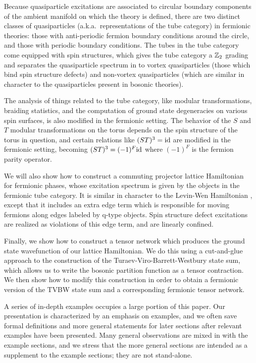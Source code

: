 Because quasiparticle excitations are associated to circular boundary components of the ambient 
manifold on which the theory is defined, there are two distinct classes of quasiparticles (a.k.a.\ representations of the tube category) in 
fermionic theories: those with anti-periodic fermion boundary conditions around the circle, and 
those with periodic boundary conditions. 
The tubes in the tube category come equipped with spin structures, which gives the tube category a $\mathbb{Z}_2$ grading
and separates the quasiparticle spectrum in to vortex quasiparticles (those which bind spin structure defects) 
and non-vortex quasiparticles (which are similar in character to the quasiparticles present in bosonic theories). 

The analysis of things related to the tube category, 
like modular transformations, braiding statistics, and the computation of ground state degeneracies on various spin surfaces,
is also modified in the fermionic setting.  
The behavior of the $S$ and $T$ modular transformations on the torus depends on the spin structure of the torus in question, and 
certain relations like $(ST)^3 = \text{id}$ are modified in the fermionic setting, becoming 
$(ST)^3=(-1)^F\text{id}$ where $(-1)^F$ is the fermion parity operator.

We will also show how to construct a commuting projector lattice Hamiltonian 
for fermionic phases, whose excitation spectrum is given by the objects in the fermionic tube category.  
It is similar in character to the Levin-Wen Hamiltonian \cite{levin2005}, 
except that it includes an extra edge term which is responsible for moving fermions along
edges labeled by q-type objects. 
Spin structure defect excitations 
are realized as violations of this edge term, and are linearly confined. 

Finally, we show how to construct a tensor network which produces the ground state 
wavefunction of our lattice Hamiltonian. We do this using a cut-and-glue approach to 
the construction of the Turaev-Viro-Barrett-Westbury state sum, which allows us to write the bosonic partition function
as a tensor contraction. 
We then show how to modify this construction in order to obtain a fermionic version of the TVBW state sum
and a corresponding fermionic tensor network.  

A series of in-depth examples occupies a large portion of this paper.
Our presentation is characterized by an emphasis on examples, 
and we often save formal definitions and more general statements 
for later sections after relevant examples have been presented.  
Many general observations are mixed in with the example sections,
and we stress that the more general sections are intended as a supplement
to the example sections; they are not stand-alone.

